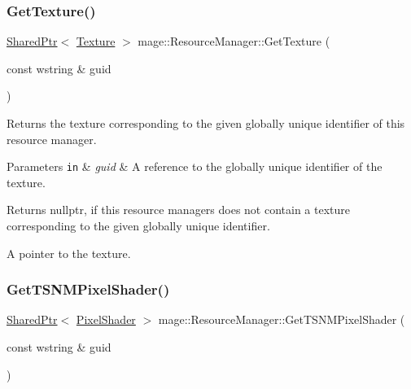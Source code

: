 \subsubsection{\texorpdfstring{Get\+Texture()}{GetTexture()}}
{\footnotesize\ttfamily \hyperlink{namespacemage_a1e01ae66713838a7a67d30e44c67703e}{Shared\+Ptr}$<$ \hyperlink{classmage_1_1_texture}{Texture} $>$ mage\+::\+Resource\+Manager\+::\+Get\+Texture (\begin{DoxyParamCaption}\item[{const wstring \&}]{guid }\end{DoxyParamCaption})\hspace{0.3cm}{\ttfamily [noexcept]}}

Returns the texture corresponding to the given globally unique identifier of this resource manager.


\begin{DoxyParams}[1]{Parameters}
\mbox{\tt in}  & {\em guid} & A reference to the globally unique identifier of the texture. \\
\hline
\end{DoxyParams}
\begin{DoxyReturn}{Returns}
{\ttfamily nullptr}, if this resource managers does not contain a texture corresponding to the given globally unique identifier. 

A pointer to the texture. 
\end{DoxyReturn}
\hypertarget{classmage_1_1_resource_manager_a8f90226c6e3f0d5ef0c159ccfc0b46aa}{}\label{classmage_1_1_resource_manager_a8f90226c6e3f0d5ef0c159ccfc0b46aa} 
\subsubsection{\texorpdfstring{Get\+T\+S\+N\+M\+Pixel\+Shader()}{GetTSNMPixelShader()}}
{\footnotesize\ttfamily \hyperlink{namespacemage_a1e01ae66713838a7a67d30e44c67703e}{Shared\+Ptr}$<$ \hyperlink{classmage_1_1_pixel_shader}{Pixel\+Shader} $>$ mage\+::\+Resource\+Manager\+::\+Get\+T\+S\+N\+M\+Pixel\+Shader (\begin{DoxyParamCaption}\item[{const wstring \&}]{guid }\end{DoxyParamCaption})\hspace{0.3cm}{\ttfamily [noexcept]}}

